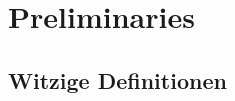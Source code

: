 
\usepackage{enumitem}
\usepackage{stmaryrd}
\usepackage{xhfill}
\usepackage{array}
\usepackage{outlines}
\usepackage{faktor}
\usepackage{tikz-cd}
\usepackage{multirow}

\newcommand{\ra}{\rightarrow}
\renewcommand{\theta}{\vartheta}
\let\phi=\varphi 
\newcommand{\E}[1]{\bE\hspace{-2pt}\left[{#1}\right]}
\newcommand{\Var}[1]{\operatorname{Var}\hspace{-2pt}\left[{#1}\right]}




\maketitle

\tableofcontents

\section{Preliminaries}

\subsection{Witzige Definitionen}

